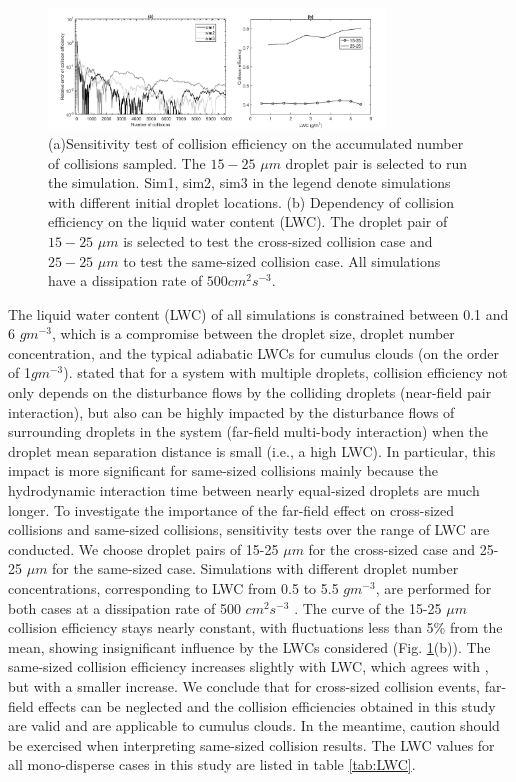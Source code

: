 \begin{figure}[ht]
\centering
\includegraphics[width=0.8\textwidth]{Figures/Chap3/vali.png}
\caption{(a)Sensitivity test of collision efficiency on the accumulated number of collisions sampled. The $15-25$ $\mu m$ droplet pair is selected to run the simulation. Sim1, sim2, sim3 in the legend denote simulations with different initial droplet locations. (b) Dependency of collision efficiency on the liquid water content (LWC). The droplet pair of $15-25$ $\mu m$ is selected to test the cross-sized collision case and $25-25$ $\mu m$ to test the same-sized collision case. All simulations have a dissipation rate of $500 cm^2s^{-3}$.  } \label{fig:vali}
\end{figure}

The liquid water content (LWC) of all simulations is constrained between 0.1 and 6 $gm^{-3}$, which is a compromise between the droplet size, droplet number concentration, and the typical adiabatic LWCs for cumulus clouds (on the order of 1$gm^{-3}$). \citet{Wang2008} stated that for a system with multiple droplets, collision efficiency not only depends on the disturbance flows by the colliding droplets (near-field pair interaction), but also can be highly impacted by the disturbance flows of surrounding droplets in the system (far-field multi-body interaction) when the droplet mean separation distance is small (i.e., a high LWC). In particular, this impact is more significant for same-sized collisions mainly because the hydrodynamic interaction time between nearly equal-sized droplets are much longer. To investigate the importance of the far-field effect on cross-sized collisions and same-sized collisions, sensitivity tests over the range of LWC are conducted. We choose droplet pairs of 15-25 $\mu m$ for the cross-sized case and 25-25 $\mu m$ for the same-sized case. Simulations with different droplet number concentrations, corresponding to LWC from 0.5 to 5.5 $gm^{-3}$, are performed for both cases  at a dissipation rate of 500 $cm^2s^{-3}$ . The curve of the 15-25 $\mu m$ collision efficiency stays nearly constant, with fluctuations less than 5\% from the mean, showing insignificant influence by the LWCs considered (Fig. \ref{fig:vali}(b)). The same-sized collision efficiency increases slightly with LWC, which agrees with \citet{Wang2008}, but with a smaller increase. We conclude that for cross-sized collision events, far-field effects can be neglected and the collision efficiencies obtained in this study are valid and are applicable to cumulus clouds. In the meantime, caution should be exercised when interpreting same-sized collision results. The LWC values for all mono-disperse cases in this study are listed in table \ref{tab:LWC}.

